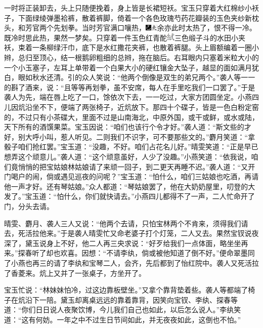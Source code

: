 一时将正装卸去，头上只随便挽着，身上皆是长裙短袄。宝玉只穿着大红棉纱小袄子，下面绿绫弹墨袷裤，散着裤脚，倚着一个各色玫瑰芍药花瓣装的玉色夹纱新枕头，和芳官两个先划拳。当时芳官满口嚷热，{\includegraphics[width=3mm]{../Images/00003}\includegraphics[width=3mm]{../Images/00012}\footnotesize \kaishu 余亦此时太热了，恨不得一冷。既冷时思此热，果然一梦矣。}只穿着一件玉色红青酡\includegraphics[width=4mm]{../images/00029}三色缎子斗的水田小夹袄，束着一条柳绿汗巾，底下是水红撒花夹裤，也散着裤腿。头上眉额编着一圈小辫，总归至顶心，结一根鹅卵粗细的总辫，拖在脑后。右耳眼内只塞着米粒大小的一个小玉塞子，左耳上单带着一个白果大小的硬红镶金大坠子，越显的面如满月犹白，眼如秋水还清。引的众人笑说：``他两个倒像是双生的弟兄两个。''袭人等一一的斟了酒来，说：``且等等再划拳，虽不安席，每人在手里吃我们一口罢了。''于是袭人为先，端在唇上吃了一口，馀依次下去，一一吃过，大家方团圆坐定。小燕四儿因炕沿坐不下，便端了两张椅子，近炕放下。那四十个碟子，皆是一色白粉定窑的，不过只有小茶碟大，里面不过是山南海北，中原外国，或干或鲜，或水或陆，天下所有的酒馔果菜。宝玉因说：``咱们也该行个令才好。''袭人道：``斯文些的才好，别大呼小叫，惹人听见。二则我们不识字，可不要那些文的。''麝月笑道：``拿骰子咱们抢红罢。''宝玉道：``没趣，不好。咱们占花名儿好。''晴雯笑道：``正是早已想弄这个顽意儿。''袭人道：``这个顽意虽好，人少了没趣。''小燕笑道：``依我说，咱们竟悄悄的把宝姑娘林姑娘请了来顽一回子，到二更天再睡不迟。''袭人道：``又开门喝户的闹，倘或遇见巡夜的问呢？''宝玉道：``怕什么，咱们三姑娘也吃酒，再请他一声才好。还有琴姑娘。''众人都道：``琴姑娘罢了，他在大奶奶屋里，叨登的大发了。''宝玉道：``怕什么，你们就快请去。''小燕四儿都得不了一声，二人忙命开了门，分头去请。

晴雯、麝月、袭人三人又说：``他两个去请，只怕宝林两个不肯来，须得我们请去，死活拉他来。''于是袭人晴雯忙又命老婆子打个灯笼，二人又去。果然宝钗说夜深了，黛玉说身上不好，他二人再三央求说：``好歹给我们一点体面，略坐坐再来。''探春听了却也欢喜。因想：``不请李纨，倘或被他知道了倒不好。''便命翠墨同了小燕也再三的请了李纨和宝琴二人，会齐，先后都到了怡红院中。袭人又死活拉了香菱来。炕上又并了一张桌子，方坐开了。

宝玉忙说：``林妹妹怕冷，过这边靠板壁坐。''又拿个靠背垫着些。袭人等都端了椅子在炕沿下一陪。黛玉却离桌远远的靠着靠背，因笑向宝钗、李纨、探春等道：``你们日日说人夜聚饮博，今儿我们自己也如此，以后怎么说人。''李纨笑道：``这有何妨。一年之中不过生日节间如此，并无夜夜如此，这倒也不怕。''

